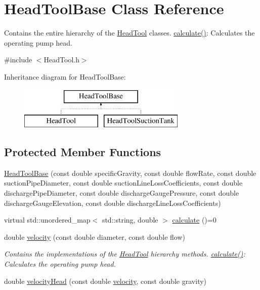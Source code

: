 \hypertarget{class_head_tool_base}{}\section{Head\+Tool\+Base Class Reference}
\label{class_head_tool_base}


Contains the entire hierarchy of the \hyperlink{class_head_tool}{Head\+Tool} classes. \hyperlink{class_head_tool_base_ab8df8f908827ce45dc5e769ea0e10f0b}{calculate()}\+: Calculates the operating pump head.  




{\ttfamily \#include $<$Head\+Tool.\+h$>$}

Inheritance diagram for Head\+Tool\+Base\+:\begin{figure}[H]
\begin{center}
\leavevmode
\includegraphics[height=2.000000cm]{d5/dc5/class_head_tool_base}
\end{center}
\end{figure}
\subsection*{Protected Member Functions}
\begin{DoxyCompactItemize}
\item 
\hyperlink{class_head_tool_base_ae5bb2325e1266c64b16937d964aea14f}{Head\+Tool\+Base} (const double specific\+Gravity, const double flow\+Rate, const double suction\+Pipe\+Diameter, const double suction\+Line\+Loss\+Coefficients, const double discharge\+Pipe\+Diameter, const double discharge\+Gauge\+Pressure, const double discharge\+Gauge\+Elevation, const double discharge\+Line\+Loss\+Coefficients)
\item 
virtual std\+::unordered\+\_\+map$<$ std\+::string, double $>$ \hyperlink{class_head_tool_base_ab8df8f908827ce45dc5e769ea0e10f0b}{calculate} ()=0
\item 
double \hyperlink{class_head_tool_base_ab79bb695c514b740d9ea01df60b68a23}{velocity} (const double diameter, const double flow)
\begin{DoxyCompactList}\small\item\em Contains the implementations of the \hyperlink{class_head_tool}{Head\+Tool} hierarchy methods. \hyperlink{class_head_tool_base_ab8df8f908827ce45dc5e769ea0e10f0b}{calculate()}\+: Calculates the operating pump head. \end{DoxyCompactList}\item 
double \hyperlink{class_head_tool_base_a1dbece05fc1a248fa2aa64b6f09602f6}{velocity\+Head} (const double \hyperlink{class_head_tool_base_ab79bb695c514b740d9ea01df60b68a23}{velocity}, const double gravity)
\end{DoxyCompactItemize}
